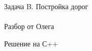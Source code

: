 {\large Задача B. Постройка дорог} 
\\
\\
Разбор от Олега

\newpage
{\large Решение на С++}
\\
\\


